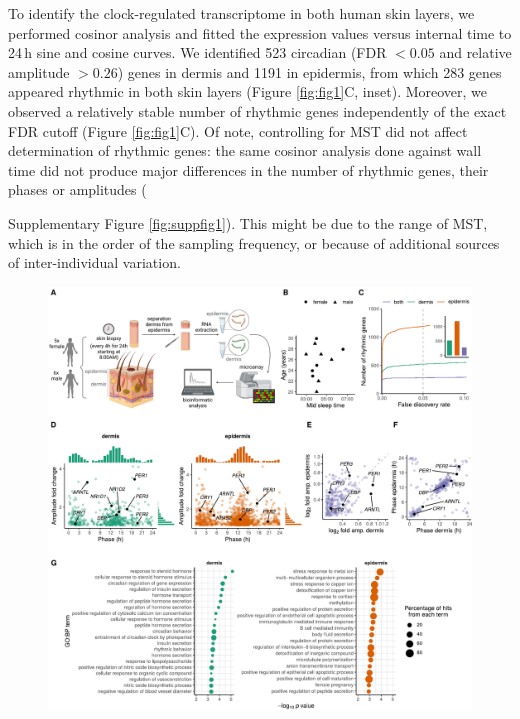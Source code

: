 To identify the clock-regulated transcriptome in both human skin layers, we performed cosinor analysis and fitted the expression values versus internal time to 24\,h sine and cosine curves. We identified 523 circadian (FDR $<0.05$ and relative amplitude $>0.26$) genes in dermis and 1191 in epidermis, from which 283 genes appeared rhythmic in both skin layers (Figure \ref{fig:fig1}C, inset). Moreover, we observed a relatively stable number of rhythmic genes independently of the exact FDR cutoff (Figure \ref{fig:fig1}C). Of note, controlling for MST did not affect determination of rhythmic genes: the same cosinor analysis done against wall time did not produce major differences in the number of rhythmic genes, their phases or amplitudes ({Supplementary Figure \ref{fig:suppfig1}). This might be due to the range of MST, which is in the order of the sampling frequency, or because of additional sources of inter-individual variation. \\
\begin{figure}[b!]
	\begin{center}
		\includegraphics[scale=0.55]{./Figures/fig1_complete_ext.pdf}

\end{center}
\end{figure}}
